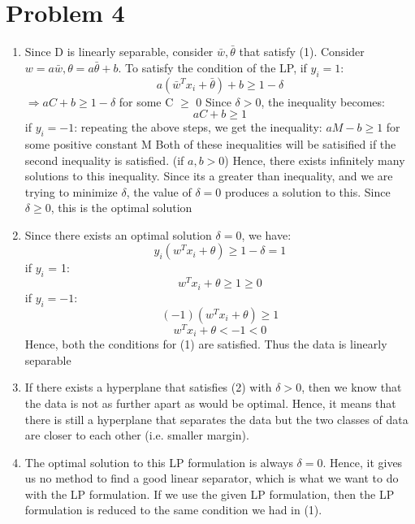 \documentclass[11pt]{article}
\newcommand{\solution}[1]{{{\color{blue}{\bf Solution:} {#1}}}}
\begin{document}
\section{Problem 4}
\begin{enumerate}
\item 
\solution{} \newline
Since D is linearly separable, consider $\bar{w}, \bar{\theta}$ that satisfy (1).
Consider $w = a \bar{w} , \theta = a \bar{\theta} + b$. To satisfy
the condition of the LP, \newline
if $y_i = 1$: 
$$
	a(\bar{w}^T x_i + \bar{\theta}) + b \geq 1 - \delta 
$$ \newline
$ 
\Rightarrow
	aC + b \geq 1 - \delta 
$ for some C $\geq$ 0 \newline
Since $ \delta > 0$, the inequality becomes:
$$
	aC + b \geq 1
$$
if $y_i = - 1$:
repeating the above steps, we get the inequality: \newline
$
aM - b \geq 1
$ for some positive constant M \newline
Both of these inequalities will be satisified if the second inequality is satisfied. (if $a, b > 0$)
Hence, there exists infinitely many solutions to this inequality.
Since its a greater than inequality, and we are trying to minimize $\delta$, the value of $\delta = 0$
produces a solution to this.
Since $\delta \geq 0$, this is the optimal solution

\item 
\solution{} \newline
Since there exists an optimal solution $\delta = 0$, we have:
$$
y_i (w^T x_i + \theta ) \geq 1 - \delta = 1
$$
if $y_i$ = 1: 
$$
 w^T x_i + \theta \geq 1 \geq 0
$$
if $y_i = -1$:
$$
	(-1)(w^T x_i + \theta) \geq 1
$$
$$
	w^T x_i + \theta < -1 < 0
$$
Hence, both the conditions for (1) are satisfied. Thus the data is linearly separable

\item 
\solution{} \newline
If there exists a hyperplane that satisfies (2) with $\delta > 0$, then we know that 
the data is not as further apart as would be optimal. Hence, it means that there is
still a hyperplane that separates the data but the two classes of data are closer to 
each other (i.e. smaller margin).

\item
\solution{} \newline
The optimal solution to this LP formulation is always $\delta = 0$. Hence, it gives us
no method to find a good linear separator, which is what we want to do with the LP 
formulation. If we use the given LP formulation, then the LP formulation is reduced to
the same condition we had in (1).


\end{enumerate}
\end{document}
